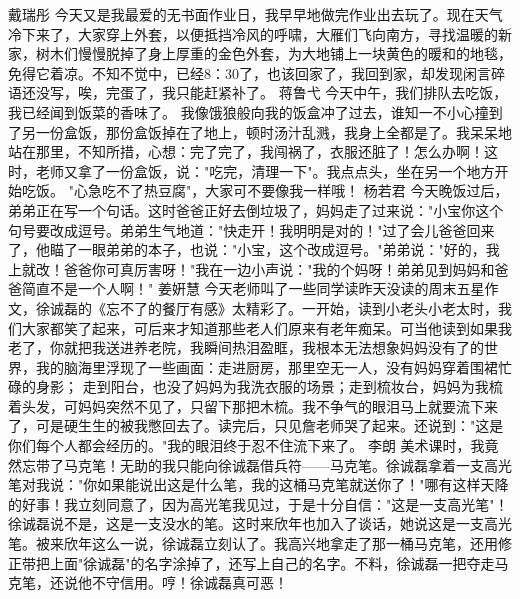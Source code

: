 {}\markdownRendererInterblockSeparator
{}戴瑞彤\markdownRendererInterblockSeparator
{}今天又是我最爱的无书面作业日，我早早地做完作业出去玩了。现在天气冷下来了，大家穿上外套，以便抵挡冷风的呼啸，大雁们飞向南方，寻找温暖的新家，树木们慢慢脱掉了身上厚重的金色外套，为大地铺上一块黄色的暖和的地毯，免得它着凉。不知不觉中，已经8：30了，也该回家了，我回到家，却发现闲言碎语还没写，唉，完蛋了，我只能赶紧补了。\markdownRendererInterblockSeparator
{}\markdownRendererInterblockSeparator
{}蒋鲁弋\markdownRendererInterblockSeparator
{}今天中午，我们排队去吃饭，我已经闻到饭菜的香味了。\markdownRendererInterblockSeparator
{}我像饿狼般向我的饭盒冲了过去，谁知一不小心撞到了另一份盒饭，那份盒饭掉在了地上，顿时汤汁乱溅，我身上全都是了。我呆呆地站在那里，不知所措，心想：完了完了，我闯祸了，衣服还脏了！怎么办啊！这时，老师又拿了一份盒饭，说："吃完，清理一下"。我点点头，坐在另一个地方开始吃饭。\markdownRendererInterblockSeparator
{}"心急吃不了热豆腐"，大家可不要像我一样哦！\markdownRendererInterblockSeparator
{}\markdownRendererInterblockSeparator
{}杨若君\markdownRendererInterblockSeparator
{}今天晚饭过后，弟弟正在写一个句话。这时爸爸正好去倒垃圾了，妈妈走了过来说："小宝你这个句号要改成逗号。弟弟生气地道："快走开！我明明是对的！"过了会儿爸爸回来了，他瞄了一眼弟弟的本子，也说："小宝，这个改成逗号。"弟弟说："好的，我上就改！爸爸你可真厉害呀！"我在一边小声说："我的个妈呀！弟弟见到妈妈和爸爸简直不是一个人啊！"\markdownRendererInterblockSeparator
{}\markdownRendererInterblockSeparator
{}姜姸慧\markdownRendererInterblockSeparator
{}今天老师叫了一些同学读昨天没读的周末五星作文，徐诚磊的《忘不了的餐厅有感》太精彩了。一开始，读到小老头小老太时，我们大家都笑了起来，可后来才知道那些老人们原来有老年痴呆。可当他读到如果我老了，你就把我送进养老院，我瞬间热泪盈眶，我根本无法想象妈妈没有了的世界，我的脑海里浮现了一些画面：走进厨房，那里空无一人，没有妈妈穿着围裙忙碌的身影； 走到阳台，也没了妈妈为我洗衣服的场景；走到梳妆台，妈妈为我梳着头发，可妈妈突然不见了，只留下那把木梳。我不争气的眼泪马上就要流下来了，可是硬生生的被我憋回去了。读完后，只见詹老师哭了起来。还说到："这是你们每个人都会经历的。"我的眼泪终于忍不住流下来了。\markdownRendererInterblockSeparator
{}\markdownRendererInterblockSeparator
{}李朗\markdownRendererInterblockSeparator
{}美术课时，我竟然忘带了马克笔！无助的我只能向徐诚磊借兵符——马克笔。徐诚磊拿着一支高光笔对我说："你如果能说出这是什么笔，我的这桶马克笔就送你了！"哪有这样天降的好事！我立刻同意了，因为高光笔我见过，于是十分自信："这是一支高光笔"！徐诚磊说不是，这是一支没水的笔。这时来欣年也加入了谈话，她说这是一支高光笔。被来欣年这么一说，徐诚磊立刻认了。我高兴地拿走了那一桶马克笔，还用修正带把上面"徐诚磊"的名字涂掉了，还写上自己的名字。不料，徐诚磊一把夺走马克笔，还说他不守信用。哼！徐诚磊真可恶！\markdownRendererInterblockSeparator
